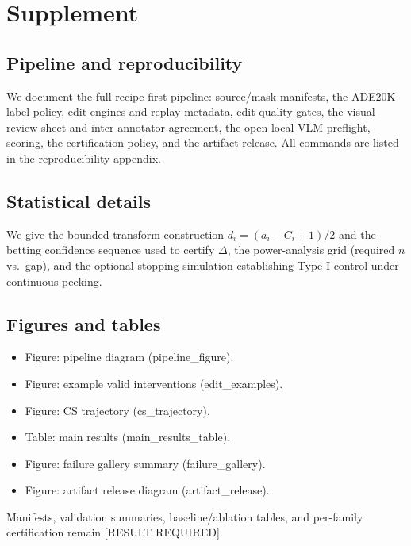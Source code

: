 \section{Supplement}

\subsection{Pipeline and reproducibility}
We document the full recipe-first pipeline: source/mask manifests, the ADE20K
label policy, edit engines and replay metadata, edit-quality gates, the visual
review sheet and inter-annotator agreement, the open-local VLM preflight, scoring,
the certification policy, and the artifact release. All commands are listed in the
reproducibility appendix.

\subsection{Statistical details}
We give the bounded-transform construction $d_i = (a_i - C_i + 1)/2$ and the
betting confidence sequence used to certify $\Delta$, the power-analysis grid
(required $n$ vs.\ gap), and the optional-stopping simulation establishing
Type-I control under continuous peeking.

\subsection{Figures and tables}
\begin{itemize}
  \item Figure: pipeline diagram (pipeline\_figure).
  \item Figure: example valid interventions (edit\_examples).
  \item Figure: CS trajectory (cs\_trajectory).
  \item Table: main results (main\_results\_table).
  \item Figure: failure gallery summary (failure\_gallery).
  \item Figure: artifact release diagram (artifact\_release).
\end{itemize}

Manifests, validation summaries, baseline/ablation tables, and per-family
certification remain [RESULT REQUIRED].
